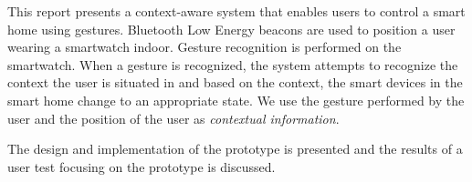 This report presents a context-aware system that enables users to control a smart home using gestures. Bluetooth Low Energy beacons are used to position a user wearing a smartwatch indoor. Gesture recognition is performed on the smartwatch. When a gesture is recognized, the system attempts to recognize the context the user is situated in and based on the context, the smart devices in the smart home change to an appropriate state. We use the gesture performed by the user and the position of the user as \emph{contextual information}.

The design and implementation of the prototype is presented and the results of a user test focusing on the prototype is discussed.